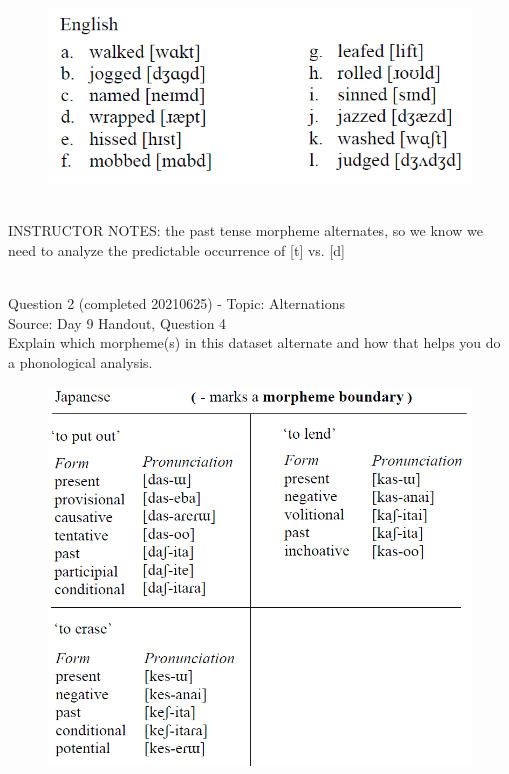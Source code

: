 \documentclass[12pt]{article}
\begin{document}
\begin{figure}[H]
\includegraphics{../images/english_past.png}
\end{figure}

~\\
INSTRUCTOR NOTES: the past tense morpheme alternates, so we know we need to analyze the predictable occurrence of [t] vs. [d]


~\\

{\large Question 2} (completed 20210625) - Topic: Alternations\\
Source: Day 9 Handout, Question 4\\

Explain which morpheme(s) in this dataset alternate and how that helps you do a phonological analysis.\\

\begin{figure}[H]
\includegraphics{../images/japanese_verbs.png}
\end{figure}
\end{document}
